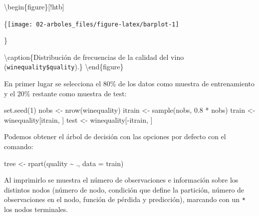 \documentclass[
  spanish,
]{book}
\newenvironment{Shaded}{\begin{snugshade}}{\end{snugshade}}
\newcommand{\AttributeTok}[1]{\textcolor[rgb]{0.77,0.63,0.00}{#1}}
\newcommand{\DecValTok}[1]{\textcolor[rgb]{0.00,0.00,0.81}{#1}}
\newcommand{\FloatTok}[1]{\textcolor[rgb]{0.00,0.00,0.81}{#1}}
\newcommand{\FunctionTok}[1]{\textcolor[rgb]{0.00,0.00,0.00}{#1}}
\newcommand{\NormalTok}[1]{#1}
\newcommand{\OtherTok}[1]{\textcolor[rgb]{0.56,0.35,0.01}{#1}}
\newcommand{\SpecialCharTok}[1]{\textcolor[rgb]{0.00,0.00,0.00}{#1}}
\theoremstyle{break}
\theoremstyle{definition}
\theoremstyle{definition}
\theoremstyle{definition}
\theoremstyle{definition}
\theoremstyle{remark}
\begin{document}
\begin{Shaded}
\end{Shaded}

\textbackslash begin\{figure\}{[}!htb{]}

\{\centering \texttt{[image: 02-arboles\_files/figure-latex/barplot-1]}

\}

\textbackslash caption\{Distribución de frecuencias de la calidad del vino (\texttt{winequality\$quality}).\}\label{fig:barplot}
\textbackslash end\{figure\}

En primer lugar se selecciona el 80\% de los datos como muestra de entrenamiento y el 20\% restante como muestra de test:

\begin{Shaded}
\begin{Highlighting}[]
\FunctionTok{set.seed}\NormalTok{(}\DecValTok{1}\NormalTok{)}
\NormalTok{nobs }\OtherTok{\textless{}{-}} \FunctionTok{nrow}\NormalTok{(winequality)}
\NormalTok{itrain }\OtherTok{\textless{}{-}} \FunctionTok{sample}\NormalTok{(nobs, }\FloatTok{0.8} \SpecialCharTok{*}\NormalTok{ nobs)}
\NormalTok{train }\OtherTok{\textless{}{-}}\NormalTok{ winequality[itrain, ]}
\NormalTok{test }\OtherTok{\textless{}{-}}\NormalTok{ winequality[}\SpecialCharTok{{-}}\NormalTok{itrain, ]}
\end{Highlighting}
\end{Shaded}

Podemos obtener el árbol de decisión con las opciones por defecto con el comando:

\begin{Shaded}
\begin{Highlighting}[]
\NormalTok{tree }\OtherTok{\textless{}{-}} \FunctionTok{rpart}\NormalTok{(quality }\SpecialCharTok{\textasciitilde{}}\NormalTok{ ., }\AttributeTok{data =}\NormalTok{ train)}
\end{Highlighting}
\end{Shaded}

Al imprimirlo se muestra el número de observaciones e información
sobre los distintos nodos (número de nodo, condición que define la partición,
número de observaciones en el nodo, función de pérdida y predicción),
marcando con un \texttt{*} los nodos terminales.
\end{document}
